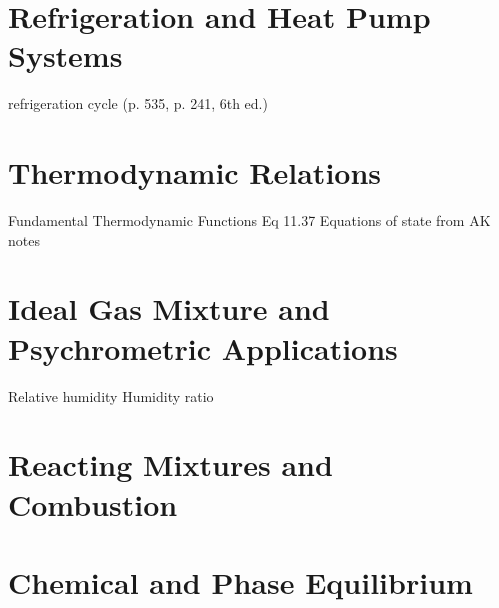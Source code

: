 \documentclass[paper=letter, fontsize=11pt]{scrartcl}
\numberwithin{equation}{section}        %
\numberwithin{figure}{section}          %
\numberwithin{table}{section}               %
\begin{document}
\newpage
\section{Refrigeration and Heat Pump Systems}

refrigeration cycle (p. 535, p. 241, 6th ed.)


\newpage
\section{Thermodynamic Relations}

Fundamental Thermodynamic Functions Eq 11.37
Equations of state from AK notes


\newpage
\section{Ideal Gas Mixture and Psychrometric Applications}

Relative humidity
Humidity ratio


\newpage
\section{Reacting Mixtures and Combustion}

\section{Chemical and Phase Equilibrium}

\end{document}

